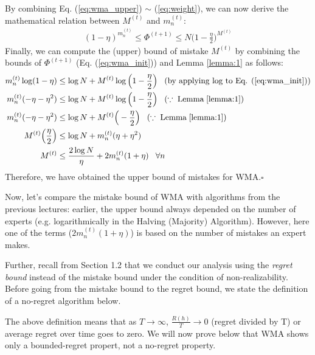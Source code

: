 \documentclass[11pt]{article}
\newcommand*{\QED}{\hfill\ensuremath{\square}}
\begin{document}
{By combining Eq. (\ref{eq:wma_upper}) $\sim$ (\ref{eq:weight}), we can now derive the mathematical relation between $M^{(t)}$ and $m_n^{(t)}$:
\begin{align}
    (1-\eta)^{m_n^{(t)}} \leq \Phi^{(t+1)}\leq N\Big(1-\frac{\eta}{2}\Big)^{M^{(t)}} \label{eq:wma_init}
\end{align}
Finally, we can compute the (upper) bound of mistake $M^{(t)}$ by combining the bounds of $\Phi^{(t+1)}$ (Eq. (\ref{eq:wma_init})) and Lemma \ref{lemma:1} as follows:
\begin{align*}
    m_n^{(t)}\log(1-\eta) &\leq \log N + M^{(t)}\log\Big(1-\frac{\eta}{2}\Big)\;\;\;(\text{by applying log to Eq. (\ref{eq:wma_init})})\\
    m_n^{(t)}(-\eta-\eta^2) &\leq \log N + M^{(t)}\log\Big(1-\frac{\eta}{2}\Big)\;\;\;(\because\; \text{Lemma}\;\ref{lemma:1})\\
    m_n^{(t)}(-\eta-\eta^2) &\leq \log N + M^{(t)}\Big(-\frac{\eta}{2}\Big)\;\;\;(\because\; \text{Lemma}\;\ref{lemma:1})\\
    M^{(t)}\Big(\frac{\eta}{2}\Big)&\leq\log N + m_n^{(t)}(\eta+\eta^2)\\
    M^{(t)}&\leq\frac{2\log N}{\eta} + 2m_n^{(t)}(1+\eta)\;\;\;\forall n
\end{align*}
Therefore, we have obtained the upper bound of mistakes for WMA.\QED}

Now, let's compare the mistake bound of WMA with algorithms from the previous lectures: earlier, the upper bound always depended on the number of experts (e.g. logarithmically in the Halving (Majority) Algorithm). However, here one of the terms ($2m_n^{(t)}(1+\eta)$) is based on the number of mistakes an expert makes. 

Further, recall from Section 1.2 that we conduct our analysis using the \textit{regret bound} instead of the mistake bound under the condition of non-realizability. Before going from the mistake bound to the regret bound, we state the definition of a no-regret algorithm below.


\normalfont
The above definition means that as $T\rightarrow\infty$, $\frac{R(h)}{T}\rightarrow0$ (regret divided by T) or average regret over time goes to zero. 
We will now prove below that WMA shows only a bounded-regret propert, not a no-regret property.
\end{document}
